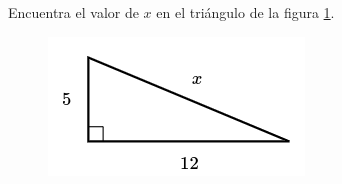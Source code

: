 Encuentra el valor de $x$ en el triángulo de la figura \ref{fig:lados_pitagoras_03}.

\begin{minipage}[t][][t]{0.35\textwidth}
    \begin{figure}[H]
        \centering
        \includegraphics[width=0.9\linewidth]{../images/lados_pitagoras_03.png}

        \caption{}
        \label{fig:lados_pitagoras_03}
    \end{figure}
\end{minipage}\hfill
